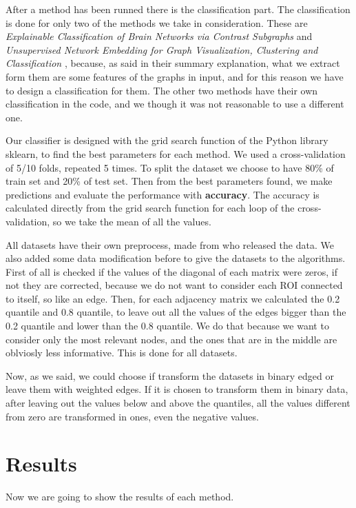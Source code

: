 After a method has been runned there is the classification part. The classification is done for only two of the methods we take in consideration. These are \textit{Explainable Classification of Brain Networks via Contrast Subgraphs} \cite{lanciano2020cs} and \textit{Unsupervised Network Embedding for Graph Visualization, Clustering and Classification} \cite{GutierrezUn}, because, as said in their summary explanation, what we extract form them are some features of the graphs in input, and for this reason we have to design a classification for them. The other two methods have their own classification in the code, and we though it was not reasonable to use a different one.
\vspace{0.5cm}

Our classifier is designed with the grid search function of the Python library sklearn, to find the best parameters for each method. We used a cross-validation of 5/10 folds, repeated 5 times. To split the dataset we choose to have 80\% of train set and 20\% of test set. Then from the best parameters found, we make predictions and evaluate the performance with \textbf{accuracy}. The accuracy is calculated directly from the grid search function for each loop of the cross-validation, so we take the mean of all the values. 
\vspace{0.5cm}

All datasets have their own preprocess, made from who released the data. We also added some data modification before to give the datasets to the algorithms. First of all is checked if the values of the diagonal of each matrix were zeros, if not they are corrected, because we do not want to consider each ROI connected to itself, so like an edge. Then, for each adjacency matrix we calculated the 0.2 quantile and 0.8 quantile, to leave out all the values of the edges bigger than the 0.2 quantile and lower than the 0.8 quantile. We do that because we want to consider only the most relevant nodes, and the ones that are in the middle are oblviosly less informative. This is done for all datasets. 
\vspace{0.5cm}

Now, as we said, we could choose if transform the datasets in binary edged or leave them with weighted edges. If it is chosen to transform them in binary data, after leaving out the values below and above the quantiles, all the values different from zero are transformed in ones, even the negative values.

\section{Results}
Now we are going to show the results of each method.
\vspace{0.5cm}

